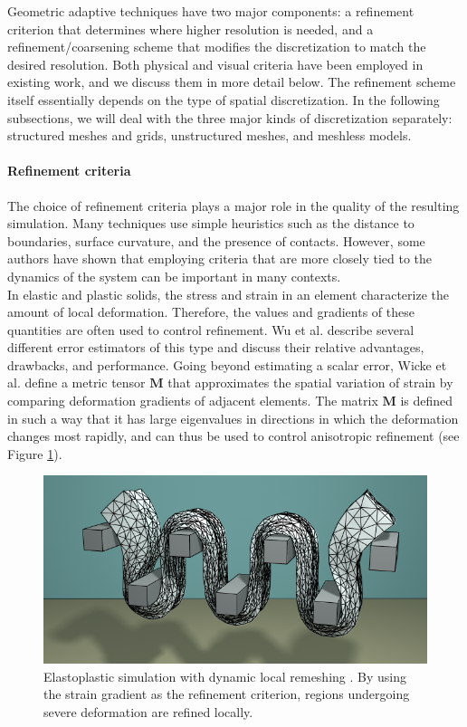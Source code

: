 Geometric adaptive techniques have two major components: a refinement criterion that determines where higher resolution is needed, and a refinement/coarsening scheme that modifies the discretization to match the desired resolution.
Both physical and visual criteria have been employed in existing work, and we discuss them in more detail below.
The refinement scheme itself essentially depends on the type of spatial discretization.
In the following subsections, we will deal with the three major kinds of discretization separately: structured meshes and grids, unstructured meshes, and meshless models.


\paragraph*{Refinement criteria}
The choice of refinement criteria plays a major role in the quality of the resulting simulation.
Many techniques use simple heuristics such as the distance to boundaries, surface curvature, and the presence of contacts.
However, some authors have shown that employing criteria that are more closely tied to the dynamics of the system can be important in many contexts.
\\
In elastic and plastic solids, the stress and strain in an element characterize the amount of local deformation.
Therefore, the values and gradients of these quantities are often used to control refinement.
Wu et al. \cite{Wu2001} describe several different error estimators of this type and discuss their relative advantages, drawbacks, and performance.
Going beyond estimating a scalar error, Wicke et al. \cite{Wicke2010} define a metric tensor $\mathbf M$ that approximates the spatial variation of strain by comparing deformation gradients of adjacent elements.
The matrix $\mathbf M$ is defined in such a way that it has large eigenvalues in directions in which the deformation changes most rapidly, and can thus be used to control anisotropic refinement (see Figure \ref{fig:Wicke2010}).
\begin{figure}[!h]
  \centering
  \includegraphics[width=0.8\linewidth]{images/starAdaptivity-cgf2016/mesh-plastic.png}
  \caption[STAR adaptivity: Tetrahedral remeshing]{Elastoplastic simulation with dynamic local remeshing \cite{Wicke2010}. By using the strain gradient as the refinement criterion, regions undergoing severe deformation are refined locally.}
  \label{fig:Wicke2010}
\end{figure}
